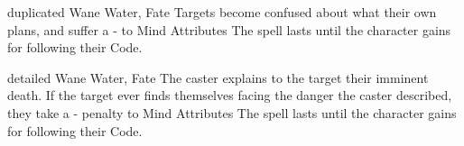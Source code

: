   {duplicated}%
  {Wane}%
  {Water, Fate}%
  {}%
  {Targets become confused about what their own plans, and suffer a - to Mind Attributes}%
  {The spell lasts until the character gains  for following their Code.}

  {detailed}%
  {Wane}%
  {Water, Fate}%
  {}%
  {The caster explains to the target their imminent death.
    If the target ever finds themselves facing the danger the caster described, they take a - penalty to Mind Attributes}%
  {The spell lasts until the character gains  for following their Code.}

